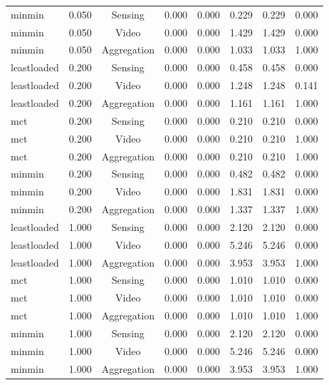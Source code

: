 \begin{table}
\begin{tabular}{lccccccc}
minmin & 0.050 & Sensing & 0.000 & 0.000 & 0.229 & 0.229 & 0.000 \\
minmin & 0.050 & Video & 0.000 & 0.000 & 1.429 & 1.429 & 0.000 \\
minmin & 0.050 & Aggregation & 0.000 & 0.000 & 1.033 & 1.033 & 1.000 \\
leastloaded & 0.200 & Sensing & 0.000 & 0.000 & 0.458 & 0.458 & 0.000 \\
leastloaded & 0.200 & Video & 0.000 & 0.000 & 1.248 & 1.248 & 0.141 \\
leastloaded & 0.200 & Aggregation & 0.000 & 0.000 & 1.161 & 1.161 & 1.000 \\
mct & 0.200 & Sensing & 0.000 & 0.000 & 0.210 & 0.210 & 0.000 \\
mct & 0.200 & Video & 0.000 & 0.000 & 0.210 & 0.210 & 1.000 \\
mct & 0.200 & Aggregation & 0.000 & 0.000 & 0.210 & 0.210 & 1.000 \\
minmin & 0.200 & Sensing & 0.000 & 0.000 & 0.482 & 0.482 & 0.000 \\
minmin & 0.200 & Video & 0.000 & 0.000 & 1.831 & 1.831 & 0.000 \\
minmin & 0.200 & Aggregation & 0.000 & 0.000 & 1.337 & 1.337 & 1.000 \\
leastloaded & 1.000 & Sensing & 0.000 & 0.000 & 2.120 & 2.120 & 0.000 \\
leastloaded & 1.000 & Video & 0.000 & 0.000 & 5.246 & 5.246 & 0.000 \\
leastloaded & 1.000 & Aggregation & 0.000 & 0.000 & 3.953 & 3.953 & 1.000 \\
mct & 1.000 & Sensing & 0.000 & 0.000 & 1.010 & 1.010 & 0.000 \\
mct & 1.000 & Video & 0.000 & 0.000 & 1.010 & 1.010 & 0.000 \\
mct & 1.000 & Aggregation & 0.000 & 0.000 & 1.010 & 1.010 & 1.000 \\
minmin & 1.000 & Sensing & 0.000 & 0.000 & 2.120 & 2.120 & 0.000 \\
minmin & 1.000 & Video & 0.000 & 0.000 & 5.246 & 5.246 & 0.000 \\
minmin & 1.000 & Aggregation & 0.000 & 0.000 & 3.953 & 3.953 & 1.000 \\
\bottomrule
\end{tabular}
\par\vspace{2pt}{\footnotesize\raggedright The decomposition localises the clock: release-to-decision and decision-to-dispatch are zero in this harness (a task is decided at release), so the entire wait appears between dispatch and execution start, where it is a whole number of control intervals. Rows are per workload class because the classes have different deadlines.\par}
\end{table}
